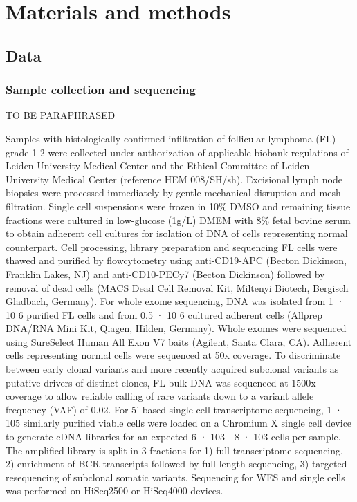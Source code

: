 \chapter{Materials and methods}

\section{Data}
\subsection{Sample collection and sequencing}
 TO BE PARAPHRASED
 
Samples with histologically confirmed infiltration of follicular lymphoma (FL) grade 1-2 were
collected under authorization of applicable biobank regulations of Leiden University Medical Center and the Ethical Committee of Leiden University Medical Center (reference HEM 008/SH/sh).
Excisional lymph node biopsies were processed immediately by gentle mechanical disruption and mesh filtration.
Single cell suspensions were frozen in 10\% DMSO and remaining tissue fractions were cultured in low-glucose (1g/L) DMEM with 8\% fetal bovine serum to obtain adherent cell cultures for isolation of DNA of cells representing normal counterpart.
Cell processing, library preparation and sequencing FL cells were thawed and purified by flowcytometry using anti-CD19-APC (Becton Dickinson, Franklin Lakes, NJ) and anti-CD10-PECy7 (Becton Dickinson) followed by removal of dead cells (MACS Dead Cell Removal Kit, Miltenyi Biotech, Bergisch Gladbach, Germany).
For whole exome sequencing, DNA was isolated from 1 · 10 6 purified FL cells and from 0.5 · 10 6 cultured adherent cells (Allprep DNA/RNA Mini Kit, Qiagen, Hilden, Germany).
Whole exomes were sequenced using SureSelect Human All Exon V7 baits (Agilent, Santa Clara, CA). Adherent cells representing normal cells were sequenced at 50x coverage.
To discriminate between early clonal variants and more recently acquired subclonal variants as putative drivers of distinct clones, FL bulk DNA was sequenced at 1500x coverage to allow reliable calling of rare variants down to a variant allele frequency (VAF) of 0.02.
For 5’ based single cell transcriptome sequencing, 1 · 105 similarly purified viable cells were loaded on a Chromium X single cell device to generate cDNA libraries for an expected 6 · 103 - 8 · 103 cells per sample. 
The amplified library is split in 3 fractions for 1) full transcriptome sequencing, 2) enrichment of BCR transcripts followed by full length sequencing, 3) targeted resequencing of subclonal somatic variants. Sequencing for WES and single cells was performed on HiSeq2500 or HiSeq4000 devices.

